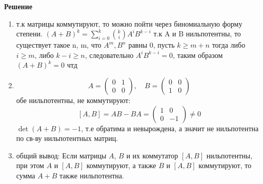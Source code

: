 \documentclass[a4paper,12pt]{article}
\begin{document}
\textbf{Решение}
\begin{enumerate}
    \item т.к матрицы коммутируют, то можно пойти через биномиальную форму степени. $(A+B)^k=\sum_{i=0}^{k}\binom{k}{i}A^iB^{k-i}$ т.к A и B нильпотентны, то существует такое n, m, что $A^m, B^n$ равны 0, пусть $k\ge m+n$ тогда либо $i\ge m$, либо $k-i\ge n$, следовательно $A^iB^{k-i}=0$, таким образом $(A+B)^k=0$ чтд
    
    \item    \[
   A = \begin{pmatrix}
   0 & 1 \\
   0 & 0
   \end{pmatrix}, \quad
   B = \begin{pmatrix}
   0 & 0 \\
   1 & 0
   \end{pmatrix}
   \] обе нильпотентны, не коммутируют:    \[
   [A, B] = AB - BA = \begin{pmatrix}
   1 & 0 \\
   0 & -1
   \end{pmatrix} \neq 0
   \]
   $\det(A+B) = -1$, т.е обратима и невырождена, а значит не нильпотентна по св-ву нильпотентных матриц.
   \item общий вывод: Если матрицы \( A \), \( B \) и их коммутатор \([A, B] \) нильпотентны, при этом \( A \) и \([A,B] \) коммутируют, а также \( B \) и \([A,B] \) коммутируют, то сумма \( A + B \) также нильпотентна.
\end{enumerate}
\end{document}
